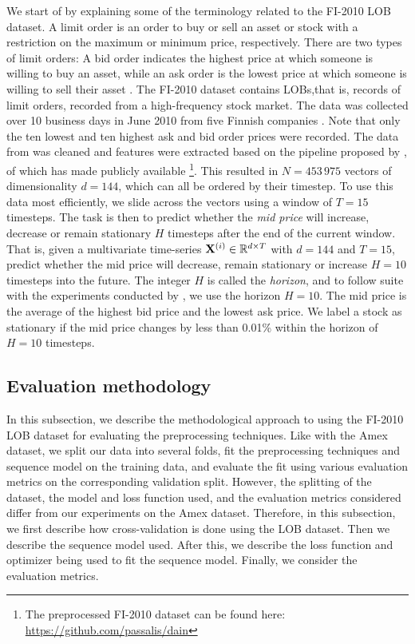 \documentclass{statsmsc}
\begin{document}
{We start of by explaining some of the terminology related to the FI-2010 \ac{LOB} dataset.
A limit order is an order to buy or sell an asset or stock with a restriction on the maximum
or minimum price, respectively.
There are two types of limit orders: A bid order indicates the highest price at
which someone is willing to buy an asset, while an ask order is the lowest
price at which someone is willing to sell their asset \citep{gould2013limit}.
The FI-2010 dataset contains \acp{LOB},that is,
records of limit orders, recorded from a high-frequency stock market.
The data was collected over 10 business days in June 2010
from five Finnish companies \citep{lob-data}. Note
that only the ten lowest and ten highest ask and bid order prices were recorded.
The data from \cite{lob-data} was cleaned and features were extracted based on the pipeline
proposed by \cite{lob_preprocess}, of which \cite{dain} has made publicly available%
\footnote{The preprocessed FI-2010 dataset can be found here: \url{https://github.com/passalis/dain}}.
%
This resulted in $N=453\,975$ vectors of dimensionality $d=144$, which can all be ordered by their
timestep.
To use this data most efficiently, we slide across the vectors using a window of
$T=15$ timesteps.
The task is then to predict whether the \textit{mid price} will increase, decrease or remain
stationary $H$ timesteps after the end of the current window. That is, given a multivariate
time-series $\mathbf{X}^{(i)} \in \mathbb{R}^{d \times T}$ with $d=144$ and $T=15$, predict whether the
mid price will decrease, remain stationary or increase $H=10$ timesteps into the future.
The integer $H$ is called the
\textit{horizon}, and to follow suite with the experiments conducted by \cite{dain},
we use the horizon $H=10$.
The mid price is the average of the highest bid price and the lowest ask price. We label a stock
as stationary if the mid price changes by less than 0.01\% within the horizon of $H=10$ timesteps.



\subsection{Evaluation methodology}%
\label{sec:lob_meth}

In this subsection, we describe the methodological approach to using the FI-2010 \ac{LOB}
dataset for evaluating the preprocessing techniques. Like with the Amex dataset, we split our
data into several folds, fit the preprocessing techniques and sequence model on the training
data, and evaluate the fit using various evaluation metrics on the corresponding validation split.
However, the splitting of the dataset, the model and loss function used, and the evaluation metrics
considered differ from our experiments on the Amex dataset. Therefore, in this subsection, we first
describe how cross-validation is done using the \ac{LOB} dataset. Then we describe the sequence
model used. After this, we describe the loss function and optimizer being used to fit the sequence
model. Finally, we consider the evaluation metrics.

}
\end{document}
